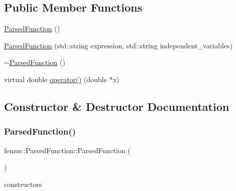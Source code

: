 \subsection*{Public Member Functions}
\begin{DoxyCompactItemize}
\item 
\mbox{\hyperlink{classfemus_1_1_parsed_function_a436551e4be53c495d745e74c1aadc7e5}{Parsed\+Function}} ()
\item 
\mbox{\hyperlink{classfemus_1_1_parsed_function_ad83cbd91495c9ea943b97f75873e5579}{Parsed\+Function}} (std\+::string expression, std\+::string independent\+\_\+variables)
\item 
\mbox{\hyperlink{classfemus_1_1_parsed_function_a618befb6d7fa2199e3234b830ce2bff8}{$\sim$\+Parsed\+Function}} ()
\item 
virtual double \mbox{\hyperlink{classfemus_1_1_parsed_function_a409352beeaf46414a0f063ecd20a2ff2}{operator()}} (double $\ast$x)
\end{DoxyCompactItemize}


\subsection{Constructor \& Destructor Documentation}
\mbox{\label{classfemus_1_1_parsed_function_a436551e4be53c495d745e74c1aadc7e5}} 
\subsubsection{\texorpdfstring{Parsed\+Function()}{ParsedFunction()}\hspace{0.1cm}{\footnotesize\ttfamily [1/2]}}
{\footnotesize\ttfamily femus\+::\+Parsed\+Function\+::\+Parsed\+Function (\begin{DoxyParamCaption}{ }\end{DoxyParamCaption})\hspace{0.3cm}{\ttfamily [inline]}}

constructors \mbox{\label{classfemus_1_1_parsed_function_ad83cbd91495c9ea943b97f75873e5579}} 
